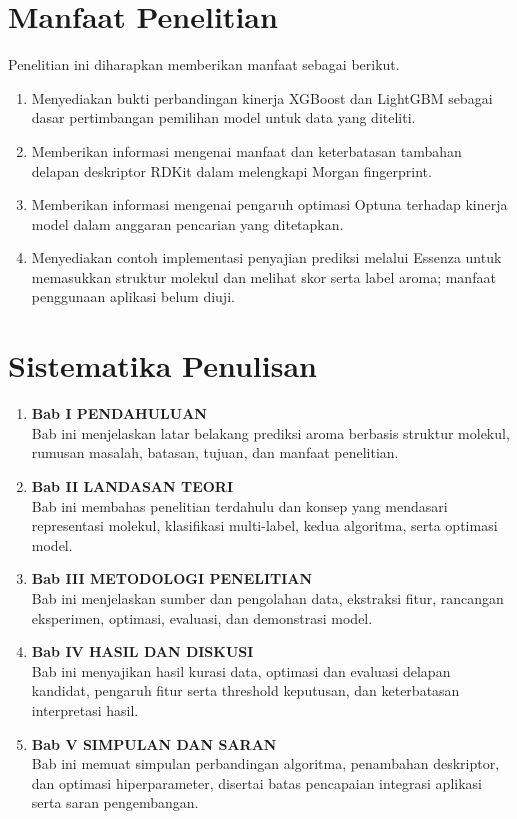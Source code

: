 \section{Manfaat Penelitian}

Penelitian ini diharapkan memberikan manfaat sebagai berikut.
\begin{enumerate}
    \item Menyediakan bukti perbandingan kinerja XGBoost dan LightGBM sebagai dasar pertimbangan pemilihan model untuk data yang diteliti.
    \item Memberikan informasi mengenai manfaat dan keterbatasan tambahan delapan deskriptor RDKit dalam melengkapi Morgan fingerprint.
    \item Memberikan informasi mengenai pengaruh optimasi Optuna terhadap kinerja model dalam anggaran pencarian yang ditetapkan.
    \item Menyediakan contoh implementasi penyajian prediksi melalui Essenza untuk memasukkan struktur molekul dan melihat skor serta label aroma; manfaat penggunaan aplikasi belum diuji.
\end{enumerate}

\section{Sistematika Penulisan}

\begin{enumerate}
    \item \textbf{Bab I PENDAHULUAN}\\
    Bab ini menjelaskan latar belakang prediksi aroma berbasis struktur molekul, rumusan masalah, batasan, tujuan, dan manfaat penelitian.
    \item \textbf{Bab II LANDASAN TEORI}\\
    Bab ini membahas penelitian terdahulu dan konsep yang mendasari representasi molekul, klasifikasi multi-label, kedua algoritma, serta optimasi model.
    \item \textbf{Bab III METODOLOGI PENELITIAN}\\
    Bab ini menjelaskan sumber dan pengolahan data, ekstraksi fitur, rancangan eksperimen, optimasi, evaluasi, dan demonstrasi model.
    \item \textbf{Bab IV HASIL DAN DISKUSI}\\
    Bab ini menyajikan hasil kurasi data, optimasi dan evaluasi delapan kandidat, pengaruh fitur serta threshold keputusan, dan keterbatasan interpretasi hasil.
    \item \textbf{Bab V SIMPULAN DAN SARAN}\\
    Bab ini memuat simpulan perbandingan algoritma, penambahan deskriptor, dan optimasi hiperparameter, disertai batas pencapaian integrasi aplikasi serta saran pengembangan.
\end{enumerate}
